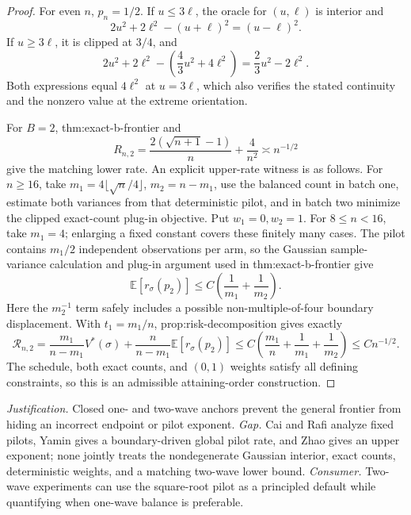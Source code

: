 \documentclass{article}
\begin{document}
\begin{proof}
For even \(n\), \(p_n=1/2\).  If \(u\leq3\ell\), the oracle for \((u,\ell)\) is interior and
\[
2u^2+2\ell^2-(u+\ell)^2=(u-\ell)^2.
\]
If \(u\geq3\ell\), it is clipped at \(3/4\), and
\[
2u^2+2\ell^2-\left(\frac43u^2+4\ell^2\right)
=\frac23u^2-2\ell^2.
\]
Both expressions equal \(4\ell^2\) at \(u=3\ell\), which also verifies the stated continuity and the nonzero value at the extreme orientation.

For \(B=2\), thm:exact-b-frontier and
\[
R_{n,2}=\frac{2(\sqrt{n+1}-1)}n+\frac4{n^2}\asymp n^{-1/2}
\]
give the matching lower rate.  An explicit upper-rate witness is as follows.  For \(n\geq16\), take
\(m_1=4\lfloor\sqrt n/4\rfloor\), \(m_2=n-m_1\), use the balanced count in batch one, estimate both variances from that deterministic pilot, and in batch two minimize the clipped exact-count plug-in objective.  Put \(w_1=0,w_2=1\).  For \(8\leq n<16\), take \(m_1=4\); enlarging a fixed constant covers these finitely many cases.  The pilot contains \(m_1/2\) independent observations per arm, so the Gaussian sample-variance calculation and plug-in argument used in thm:exact-b-frontier give
\[
\mathbb E[r_\sigma(p_2)]\leq C\left(\frac1{m_1}+\frac1{m_2}\right).
\]
Here the \(m_2^{-1}\) term safely includes a possible non-multiple-of-four boundary displacement.  With \(t_1=m_1/n\), prop:risk-decomposition gives exactly
\[
\mathcal R_{n,2}
=\frac{m_1}{n-m_1}V^*(\sigma)
 +\frac n{n-m_1}\mathbb E[r_\sigma(p_2)]
\leq C\left(\frac{m_1}{n}+\frac1{m_1}+\frac1{m_2}\right)
\leq Cn^{-1/2}.
\]
The schedule, both exact counts, and \((0,1)\) weights satisfy all defining constraints, so this is an admissible attaining-order construction.
\end{proof}
\par\smallskip\noindent \textit{Justification.} Closed one- and two-wave anchors prevent the general frontier from hiding an incorrect endpoint or pilot exponent. \textit{Gap.} Cai and Rafi analyze fixed pilots, Yamin gives a boundary-driven global pilot rate, and Zhao gives an upper exponent; none jointly treats the nondegenerate Gaussian interior, exact counts, deterministic weights, and a matching two-wave lower bound. \textit{Consumer.} Two-wave experiments can use the square-root pilot as a principled default while quantifying when one-wave balance is preferable.
\end{document}

